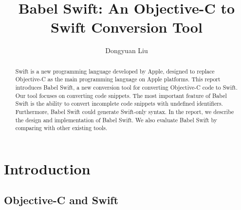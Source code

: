 \documentclass{sfuthesis}
\title{Babel Swift: An Objective-C to Swift Conversion Tool}
\author{Dongyuan Liu}
\begin{document}
\frontmatter
\maketitle{}
\makecommittee{}

\begin{abstract}
Swift is a new programming language developed by Apple, designed to replace Objective-C as the main programming language on Apple platforms. This report introduces Babel Swift, a new conversion tool for converting Objective-C code to Swift. Our tool focuses on converting code snippets. The most important feature of Babel Swift is the ability to convert incomplete code snippets with undefined identifiers. Furthermore, Babel Swift could generate Swift-only syntax. In the report, we describe the design and implementation of Babel Swift. We also evaluate Babel Swift by comparing with other existing tools.
\end{abstract}





\tableofcontents\clearpage
{}\listoftables\clearpage
{}\listoffigures\clearpage
{}\listoflistings





%
%

\mainmatter%

\chapter{Introduction}

\section{Objective-C and Swift}
\end{document}
